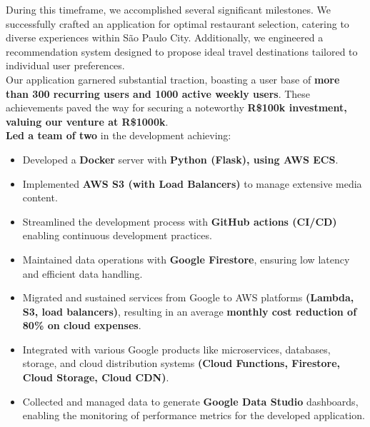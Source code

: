 During this timeframe, we accomplished several significant milestones. We successfully crafted an application for optimal restaurant selection, catering to diverse experiences within São Paulo City. Additionally, we engineered a recommendation system designed to propose ideal travel destinations tailored to individual user preferences.\\
Our application garnered substantial traction, boasting a user base of \textbf{more than 300 recurring users and 1000 active weekly users}. These achievements paved the way for securing a noteworthy \textbf{R\$100k investment, valuing our venture at R\$1000k}.\\
\textbf{Led a team of two} in the development achieving:
\begin{itemize}
  \item Developed a \textbf{Docker} server with \textbf{Python (Flask), using AWS ECS}.
  \item Implemented \textbf{AWS S3 (with Load Balancers)} to manage extensive media content.
  \item Streamlined the development process with \textbf{GitHub actions (CI/CD)} enabling continuous development practices.
  \item Maintained data operations with \textbf{Google Firestore}, ensuring low latency and efficient data handling. 
  \item Migrated and sustained services from Google to AWS platforms \textbf{(Lambda, S3, load balancers)}, resulting in an average \textbf{monthly cost reduction of 80\% on cloud expenses}.
  \item Integrated with various Google products like microservices, databases, storage, and cloud distribution systems \textbf{(Cloud Functions, Firestore, Cloud Storage, Cloud CDN)}.
  \item Collected and managed data to generate \textbf{Google Data Studio} dashboards, enabling the monitoring of performance metrics for the developed application.
\end{itemize}
